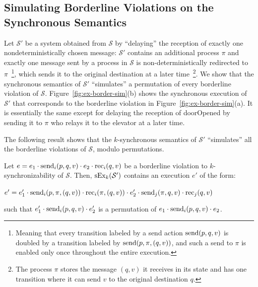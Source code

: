 \subsection{Simulating Borderline Violations on the Synchronous Semantics}\label{ssec:verif2}

Let $\mathcal{S'}$ be a system obtained from $\mathcal{S}$ by ``delaying'' the reception of exactly one nondeterministically chosen message: $\mathcal{S'}$ contains an additional process $\pi$ and exactly one message sent by a process in $\mathcal{S}$ is non-deterministically redirected to $\pi$~\footnote{Meaning that every transition labeled by a send action $\senda{p,q,v}$ is doubled by a transition labeled by $\senda{p,\pi,(q,v)}$, and such a send to $\pi$ is enabled only once throughout the entire execution.}, which sends it to the original destination at a later time~\footnote{The process $\pi$ stores the message $(q,v)$ it receives in its state and has one transition where it can send $v$ to the original destination $q$.}.
We show that the synchronous semantics of $\mathcal{S'}$ ``simulates'' a permutation of every borderline violation of 
$\mathcal{S}$. 
Figure~\ref{fig:ex-border-sim}(b) shows the synchronous execution of $\mathcal{S'}$ that corresponds to the borderline violation in Figure~\ref{fig:ex-border-sim}(a). It is essentially the same except for delaying the reception of {\sf doorOpened} by sending it to $\pi$ who relays it to the elevator at a later time.


The following result shows that the $k$-synchronous semantics of $\mathcal{S'}$ ``simulates'' all the borderline violations of $\mathcal{S}$, modulo permutations. 
\vspace{-1mm}
\begin{lemma}\label{lem:critical}
Let $e=e_1\cdot \send{i}{p,q,v}\cdot e_2\cdot \rec{i}{q,v}$ be a borderline violation to $k$-synchronizability of $\mathcal{S}$. Then, $\synchExec{\mathcal{S'}}{k}$ contains an execution $e'$ of the form: 
\begin{center}
$e'=e_1'\cdot \send{i}{p,\pi,(q,v)}\cdot \rec{i}{\pi,(q,v)}\cdot e_2'\cdot \send{j}{\pi,q,v}\cdot \rec{j}{q,v}$
\end{center}
such that $e_1'\cdot \send{i}{p,q,v} \cdot e_2'$ is a permutation of $e_1\cdot \send{i}{p,q,v}\cdot e_2$.
\vspace{-1mm}
\end{lemma}

